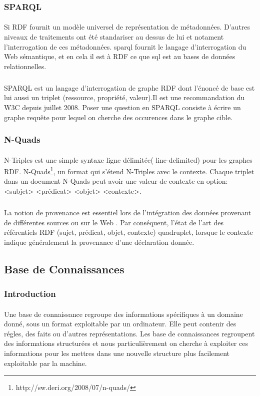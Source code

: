 \documentclass[12pt,a4	]{report}
\begin{document}
\subsubsection*{SPARQL}
\paragraph{}
Si RDF fournit un modèle universel de représentation de métadonnées. D'autres niveaux de traitements ont été standariser au dessus de lui et notament l'interrogation de ces métadonnées.
\gls{sparql} fournit le langage d'interrogation du Web sémantique, et en cela il est à RDF ce que \gls{sql} est au bases de données relationnelles.
\subparagraph{}
SPARQL est un langage d'interrogation de graphe RDF dont l'énoncé de base est lui aussi un triplet (ressource, propriété, valeur).Il est une recommandation du W3C depuis juillet 2008.
Poser une question en SPARQL consiste à écrire un graphe requête pour lequel on cherche des occurences dans le graphe cible.
\subsubsection*{N-Quads}
\paragraph{}
N-Triples est une simple syntaxe ligne délimitée( line-delimited) pour les graphes RDF. N-Quads\footnote{http://sw.deri.org/2008/07/n-quads/}, un format qui s'étend N-Triples avec le contexte. Chaque triplet dans un document N-Quads peut avoir une valeur de contexte en option:
\newline
<subjet> <prédicat> <objet> <contexte>.
\subparagraph{}
La notion de provenance est essentiel lors de l'intégration des données provenant de différentes sources ou sur le Web . Par conséquent, l'état de l'art des référentiels RDF (sujet, prédicat, objet, contexte) quadruplet, lorsque le contexte indique généralement la provenance d'une déclaration donnée.
\newpage
\subsection*{Base de Connaissances}
\subsubsection*{Introduction}
\paragraph{}
Une base de connaissance regroupe des informations spécifiques à un domaine donné, sous un format exploitable par un ordinateur. Elle peut contenir des régles, des faits ou d'autres représentations. Les base de connaissances regroupent des informations structurées et nous particulièrement on cherche à exploiter ces informations pour les mettres dans une nouvelle structure plus facilement exploitable par la machine.
\end{document}
